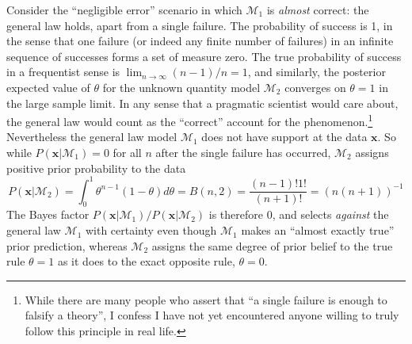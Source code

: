 \documentclass[doc]{apa6}
\let\rmarkdownfootnote\footnote%
\def\footnote{\protect\rmarkdownfootnote}
\theoremstyle{definition}
\theoremstyle{definition}
\theoremstyle{definition}
\theoremstyle{remark}
\begin{document}
Consider the \enquote{negligible error} scenario in which
\(\mathcal{M}_1\) is \emph{almost} correct: the general law holds, apart
from a single failure. The probability of success is 1, in the sense
that one failure (or indeed any finite number of failures) in an
infinite sequence of successes forms a set of measure zero. The true
probability of success in a frequentist sense is
\(\lim_{n\rightarrow\infty} (n-1)/n = 1\), and similarly, the posterior
expected value of \(\theta\) for the unknown quantity model
\(\mathcal{M}_2\) converges on \(\theta = 1\) in the large sample limit.
In any sense that a pragmatic scientist would care about, the general
law would count as the \enquote{correct} account for the
phenomenon.\footnote{While there are many people who assert that
  \enquote{a single failure is enough to falsify a theory}, I confess I
  have not yet encountered anyone willing to truly follow this principle
  in real life.} Nevertheless the general law model \(\mathcal{M}_1\)
does not have support at the data \(\bm{x}\). So while
\(P(\bm{x}|\mathcal{M}_1)=0\) for all \(n\) after the single failure has
occurred, \(\mathcal{M}_2\) assigns positive prior probability to the
data \[
P(\bm{x}|\mathcal{M}_2) = \int_0^1 \theta^{n-1} (1-\theta) d\theta = B(n,2) = \frac{(n-1)! 1!}{(n+1)!} = (n(n+1))^{-1}
\] The Bayes factor
\(P(\bm{x}|\mathcal{M}_1) / P(\bm{x}|\mathcal{M}_2)\) is therefore 0,
and selects \emph{against} the general law \(\mathcal{M}_1\) with
certainty even though \(\mathcal{M}_1\) makes an \enquote{almost exactly
true} prior prediction, whereas \(\mathcal{M}_2\) assigns the same
degree of prior belief to the true rule \(\theta=1\) as it does to the
exact opposite rule, \(\theta = 0\).
\end{document}
